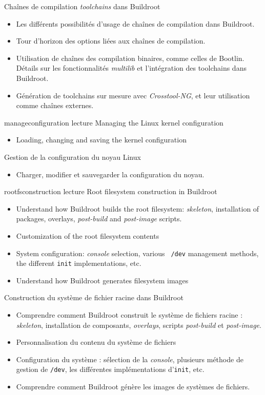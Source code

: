 {Chaînes de compilation {\em toolchains} dans Buildroot}
{
  \begin{itemize}
  \item Les différents possibilités d'usage de chaînes de compilation
	dans Buildroot.
  \item Tour d'horizon des options liées aux chaînes de compilation.
  \item Utilisation de chaînes des compilation binaires, comme
	celles de Bootlin. Détails sur les fonctionnalités
        {\em multilib} et l'intégration des toolchains dans Buildroot.
  \item Génération de toolchains sur mesure avec {\em Crosstool-NG},
	et leur utilisation comme chaînes externes.
  \end{itemize}
}
{manageconfiguration}
{lecture}
{Managing the Linux kernel configuration}
{
  \begin{itemize}
  \item Loading, changing and saving the kernel configuration
  \end{itemize}
}
{Gestion de la configuration du noyau Linux}
{
  \begin{itemize}
  \item Charger, modifier et sauvegarder la configuration du noyau.
  \end{itemize}
}
{rootfsconstruction}
{lecture}
{Root filesystem construction in Buildroot}
{
  \begin{itemize}
  \item Understand how Buildroot builds the root filesystem: {\em
      skeleton}, installation of packages, overlays, {\em post-build}
    and {\em post-image} scripts.
  \item Customization of the root filesystem contents
  \item System configuration: {\em console} selection, various {\tt
      /dev} management methods, the different {\tt init}
    implementations, etc.
  \item Understand how Buildroot generates filesystem images
  \end{itemize}
}
{Construction du système de fichier racine dans Buildroot}
{
  \begin{itemize}
  \item Comprendre comment Buildroot construit le système de fichiers
	racine : {\em skeleton}, installation de composants, {\em
        overlays}, scripts {\em post-build} et {\em post-image}.
  \item Personnalisation du contenu du système de fichiers
  \item Configuration du système : sélection de la {\em console},
	plusieurs méthode de gestion de {\tt /dev}, les différentes
	implémentations d'{\tt init}, etc.
  \item Comprendre comment Buildroot génère les images de systèmes de
	fichiers.
  \end{itemize}
}
